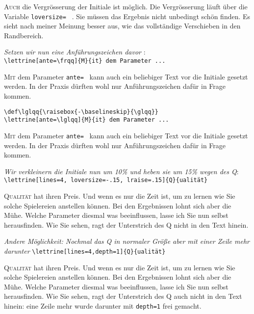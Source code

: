 \documentclass[a4paper,12pt,german]{article}
\begin{document}
\lettrine[lines=3, lhang=0.33, loversize=0.25]{A}{uch}
die Vergrösserung der Initiale ist möglich. Die Vergrösserung läuft
über die Variable \verb+loversize= + . Sie müssen das Ergebnis nicht
unbedingt schön finden. Es sieht nach meiner Meinung besser aus, wie das
vollständige Verschieben in den Randbereich.

\vspace{\baselineskip}
\textit{Setzen wir nun eine %
         Anführungszeichen davor} :\\
\verb+\lettrine[ante=\frqq]{M}{it} dem Parameter ...+

\lettrine[ante=\frqq]{M}{it} dem Parameter \verb+ante= + kann auch ein
beliebiger Text vor die Initiale gesetzt werden. In der Praxis dürften
wohl nur Anführungszeichen dafür in Frage kommen.

\vspace{\baselineskip}
\verb+\def\lglqq{\raisebox{-\baselineskip}{\glqq}}+\\
\verb+\lettrine[ante=\lglqq]{M}{it} dem Parameter ...+
\def\lglqq{\raisebox{-\baselineskip}{\glqq}}

\lettrine[ante=\lglqq]{M}{it} dem Parameter \verb+ante= + kann auch ein
beliebiger Text vor die Initiale gesetzt werden. In der Praxis dürften
wohl nur Anführungszeichen dafür in Frage kommen.

\newpage
\textit{Wir verkleinern die Initiale nun um 10\% und heben sie
um 15\% wegen des {\glqq}Q{\grqq}}:\\
\verb+\lettrine[lines=4, loversize=-.15, lraise=.15]{Q}{ualität}+

\lettrine[lines=4, loversize=-.15, lraise=.15]{Q}{ualität} hat ihren
Preis.  Und wenn es nur die Zeit ist, um zu lernen wie Sie solche Spielereien
anstellen können. Bei den Ergebnissen lohnt sich aber die Mühe. Welche
Parameter diesmal was beeinflussen, lasse ich Sie nun selbst herausfinden.
Wie Sie sehen, ragt der Unterstrich des {\glqq}Q{\grqq} nicht in den Text
hinein.

\vspace{.5\baselineskip}
\textit{Andere Möglichkeit: Nochmal das {\glqq}Q{\grqq} in normaler
  Größe aber mit einer Zeile mehr darunter}
\verb+\lettrine[lines=4,depth=1]{Q}{ualität}+

\lettrine[lines=4,depth=1]{Q}{ualität} hat ihren Preis.  Und wenn es nur die
Zeit ist, um zu lernen wie Sie solche Spielereien anstellen können. Bei den
Ergebnissen lohnt sich aber die Mühe. Welche Parameter diesmal was
beeinflussen, lasse ich Sie nun selbst herausfinden. Wie Sie sehen, ragt der
Unterstrich des {\glqq}Q{\grqq} auch nicht in den Text hinein: eine Zeile mehr
wurde darunter mit \verb+depth=1+ frei gemacht.
\end{document}
